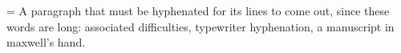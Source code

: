 \documentclass{article}
\begin{document}
\makeatletter
\language=\l@nohyphenation
{}
\makeatother
\setlength{\hsize}{60pt}\setlength{\textwidth}{60pt}
A paragraph that must be hyphenated for its lines to come out, since these words are long: associated difficulties, typewriter hyphenation, a manuscript in maxwell's hand.
\end{document}
